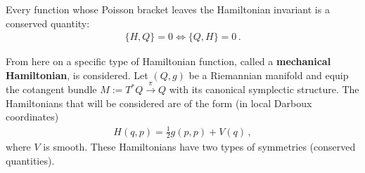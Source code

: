     \begin{theorem}[Noether]
        Every function whose Poisson bracket leaves the Hamiltonian invariant is a conserved quantity:
        \begin{gather}
            \{H,Q\} = 0\iff\{Q,H\} = 0\,.
        \end{gather}
    \end{theorem}

    From here on a specific type of Hamiltonian function, called a \textbf{mechanical Hamiltonian}, is considered. Let $(Q,g)$ be a Riemannian manifold and equip the cotangent bundle $M:=T^*Q\overset{\pi}{\rightarrow}Q$ with its canonical symplectic structure. The Hamiltonians that will be considered are of the form (in local Darboux coordinates)
    \begin{gather}
        H(q,p) = \frac{1}{2}g(p,p) + V(q)\,,
    \end{gather}
    where $V$ is smooth. These Hamiltonians have two types of symmetries (conserved quantities).


